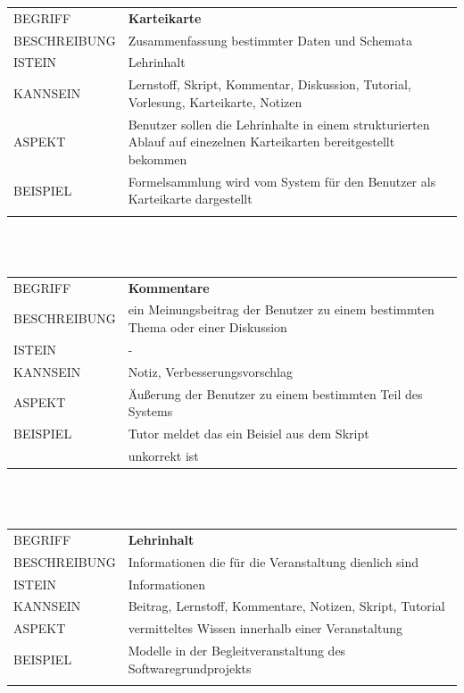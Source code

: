 \documentclass[12pt,a4paper]{article}
\begin{document}
\begin{tabular}{l p{12cm}}
BEGRIFF 	 & \textbf{Karteikarte} \\ 
BESCHREIBUNG & Zusammenfassung bestimmter Daten und Schemata\\ 
ISTEIN   	 & Lehrinhalt\\
KANNSEIN 	 & Lernstoff, Skript, Kommentar, Diskussion, Tutorial, Vorlesung, Karteikarte, Notizen\\ 
ASPEKT   	 & Benutzer sollen die Lehrinhalte in einem strukturierten Ablauf auf einezelnen Karteikarten bereitgestellt bekommen\\
BEISPIEL 	 & Formelsammlung wird vom System für den Benutzer als Karteikarte 			   dargestellt\\\\
\hline
\end{tabular}\\\\  

\begin{tabular}{l p{12cm}}
BEGRIFF 	 & \textbf{Kommentare} \\ 
BESCHREIBUNG & ein Meinungsbeitrag der Benutzer zu einem bestimmten Thema oder einer Diskussion\\ 
ISTEIN   	 & -\\
KANNSEIN 	 & Notiz, Verbesserungsvorschlag\\ 
ASPEKT   	 & Äußerung der Benutzer zu einem bestimmten Teil des Systems\\
BEISPIEL 	 & Tutor meldet das ein Beisiel aus dem Skript\\
			 & unkorrekt ist\\
\hline
\end{tabular}\\\\  

\begin{tabular}{l p{12cm}}
BEGRIFF 	 & \textbf{Lehrinhalt} \\ 
BESCHREIBUNG & Informationen die für die Veranstaltung dienlich sind\\ 
ISTEIN   	 & Informationen\\
KANNSEIN 	 & Beitrag, Lernstoff, Kommentare, Notizen, Skript, Tutorial\\ 
ASPEKT   	 & vermitteltes Wissen innerhalb einer Veranstaltung\\
BEISPIEL 	 & Modelle in der Begleitveranstaltung des Softwaregrundprojekts\\\\
\hline
\end{tabular}\\\\  
\end{document}
